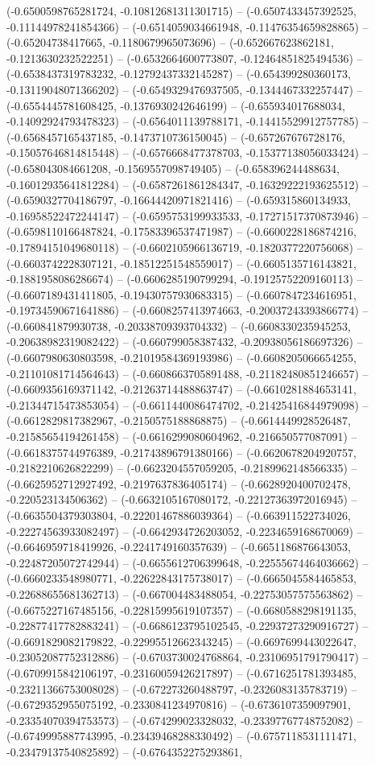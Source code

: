 (-0.6500598765281724, -0.10812681311301715) -- (-0.6507433457392525, -0.11144978241854366) -- (-0.6514059034661948, -0.11476354659828865) -- (-0.65204738417665, -0.1180679965073696) -- (-0.652667623862181, -0.1213630232522251) -- (-0.6532664600773807, -0.12464851825494536) -- (-0.6538437319783232, -0.12792437332145287) -- (-0.654399280360173, -0.13119048071366202) -- (-0.6549329476937505, -0.1344467332257447) -- (-0.6554445781608425, -0.1376930242646199) -- (-0.655934017688034, -0.14092924793478323) -- (-0.6564011139788171, -0.14415529912757785) -- (-0.6568457165437185, -0.1473710736150045) -- (-0.657267676728176, -0.15057646814815448) -- (-0.6576668477378703, -0.15377138056033424) -- (-0.658043084661208, -0.1569557098749405) -- (-0.658396244488634, -0.16012935641812284) -- (-0.6587261861284347, -0.16329222193625512) -- (-0.6590327704186797, -0.16644420971821416) -- (-0.659315860134933, -0.16958522472244147) -- (-0.6595753199933533, -0.17271517370873946) -- (-0.6598110166487824, -0.17583396537471987) -- (-0.6600228186874216, -0.17894151049680118) -- (-0.6602105966136719, -0.1820377220756068) -- (-0.6603742228307121, -0.18512251548559017) -- (-0.6605135716143821, -0.1881958086286674) -- (-0.6606285190799294, -0.19125752209160113) -- (-0.6607189431411805, -0.19430757930683315) -- (-0.6607847234616951, -0.19734590671641886) -- (-0.6608257413974663, -0.20037243393866774) -- (-0.660841879930738, -0.20338709393704332) -- (-0.6608330235945253, -0.20638982319082422) -- (-0.660799058387432, -0.20938056186697326) -- (-0.6607980630803598, -0.21019584369193986) -- (-0.6608205066654255, -0.21101081714564643) -- (-0.6608663705891488, -0.21182480851246657) -- (-0.6609356169371142, -0.21263714488863747) -- (-0.6610281884653141, -0.21344715473853054) -- (-0.6611440086474702, -0.21425416844979098) -- (-0.6612829817382967, -0.2150575188868875) -- (-0.6614449928526487, -0.21585654194261458) -- (-0.6616299080604962, -0.216650577087091) -- (-0.6618375744976389, -0.21743896791380166) -- (-0.6620678204920757, -0.2182210626822299) -- (-0.6623204557059205, -0.2189962148566335) -- (-0.6625952712927492, -0.2197637836405174) -- (-0.6628920400702478, -0.220523134506362) -- (-0.6632105167080172, -0.22127363972016945) -- (-0.6635504379303804, -0.22201467886039364) -- (-0.663911522734026, -0.22274563933082497) -- (-0.6642934726203052, -0.2234659168670069) -- (-0.6646959718419926, -0.2241749160357639) -- (-0.6651186876643053, -0.22487205072742944) -- (-0.6655612706399648, -0.22555674464036662) -- (-0.6660233548980771, -0.22622843175738017) -- (-0.6665045584465853, -0.22688655681362713) -- (-0.667004483488054, -0.22753057575563862) -- (-0.6675227167485156, -0.22815995619107357) -- (-0.6680588298191135, -0.22877417782883241) -- (-0.6686123795102545, -0.22937273290916727) -- (-0.6691829082179822, -0.22995512662343245) -- (-0.6697699443022647, -0.23052087752312886) -- (-0.6703730024768864, -0.23106951791790417) -- (-0.6709915842106197, -0.23160059426217897) -- (-0.6716251781393485, -0.23211366753008028) -- (-0.672273260488797, -0.2326083135783719) -- (-0.6729352955075192, -0.2330841234970816) -- (-0.6736107359097901, -0.23354070394753573) -- (-0.674299023328032, -0.23397767748752082) -- (-0.6749995887743995, -0.23439468288330492) -- (-0.6757118531111471, -0.23479137540825892) -- (-0.6764352275293861, 